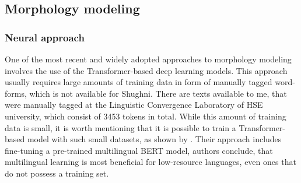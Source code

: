 \subsection{Morphology modeling}
\subsubsection{Neural approach}
\par One of the most recent and widely adopted approaches to morphology modeling involves the use of the Transformer-based deep learning models. This approach usually requires large amounts of training data in form of manually tagged word-forms, which is not available for Shughni. There are texts available to me, that were manually tagged at the Linguistic Convergence Laboratory of HSE university, which consist of 3453 tokens in total. While this amount of training data is small, it is worth mentioning that it is possible to train a Transformer-based model with such small datasets, as shown by \cite{kondratyuk_straka_model_2019}. Their approach includes fine-tuning a pre-trained multilingual BERT model, authors conclude, that multilingual learning is most beneficial for low-resource languages, even ones that do not possess a training set.
